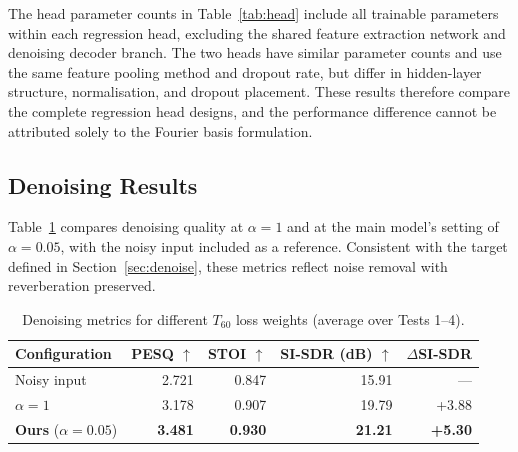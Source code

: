 \documentclass[a4paper,fleqn]{cas-sc}
\begin{document}


The head parameter counts in Table~\ref{tab:head} include all trainable parameters within each regression head, excluding the shared feature extraction network and denoising decoder branch. The two heads have similar parameter counts and use the same feature pooling method and dropout rate, but differ in hidden-layer structure, normalisation, and dropout placement. These results therefore compare the complete regression head designs, and the performance difference cannot be attributed solely to the Fourier basis formulation.



\subsection{Denoising Results}
\label{sec:denoise_results}



Table~\ref{tab:denoise} compares denoising quality at $\alpha=1$ and at the main model's setting of $\alpha=0.05$, with the noisy input included as a reference. Consistent with the target defined in Section~\ref{sec:denoise}, these metrics reflect noise removal with reverberation preserved.



\begin{table}[pos=htbp]
  \centering
  \caption{Denoising metrics for different $T_{60}$ loss weights (average over Tests 1--4).}
  \label{tab:denoise}
  \small
  \begin{tabular}{lrrrr}
    \toprule
    Configuration & PESQ $\uparrow$ & STOI $\uparrow$ & SI-SDR (dB) $\uparrow$ & $\Delta$SI-SDR \\
    \midrule
    Noisy input & 2.721 & 0.847 & 15.91 & --- \\
    $\alpha=1$ & 3.178 & 0.907 & 19.79 & +3.88 \\
    \textbf{Ours} ($\alpha=0.05$) & \textbf{3.481} & \textbf{0.930} & \textbf{21.21} & \textbf{+5.30} \\
    \bottomrule
  \end{tabular}
\end{table}


\end{document}
